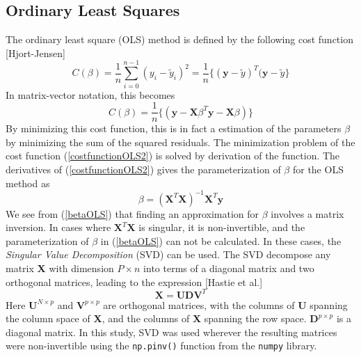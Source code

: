 \documentclass{article}
\begin{document}
\subsection{Ordinary Least Squares}\label{OLSsection}
The ordinary least square (OLS) method is defined by the following cost function [Hjort-Jensen]
\begin{equation}\label{costfunctionOLS}
C(\beta) = \frac{1}{n} \sum_{i=0}^{n-1} (y_{i} - \tilde{y}_{i})^{2} = \frac{1}{n} \{ (\textbf{y} - \tilde{y})^{T} (\textbf{y} - \tilde{y} \}
\end{equation}
In matrix-vector notation, this becomes
\begin{equation}\label{costfunctionOLS2}
C(\beta)= \dfrac{1}{n} \{( \textbf{y}-\textbf{X}\beta^{T}\textbf{y}-\textbf{X}\beta)\}
\end{equation}
By minimizing this cost function, this is in fact a estimation of the parameters $\beta$ by minimizing the sum of the squared residuals. The minimization problem of the cost function (\ref{costfunctionOLS2}) is solved by derivation of the function. The derivatives of (\ref{costfunctionOLS2}) gives the parameterization of $\beta$ for the OLS method as
\begin{equation}\label{betaOLS}
\beta = (\textbf{X}^{T}\textbf{X})^{-1}\textbf{X}^{T}\textbf{y}
\end{equation}
We see from (\ref{betaOLS}) that finding an approximation for $\beta$ involves a matrix inversion. In cases where $\textbf{X}^{T}\textbf{X}$ is singular, it is non-invertible, and the parameterization of $\beta$ in (\ref{betaOLS}) can not be calculated. In these cases, the \textit{Singular Value Decomposition} (SVD) can be used. The SVD decompose any matrix \textbf{X} with dimension $P \times n$ into terms of a diagonal matrix and two orthogonal matrices, leading to the expression [Hastie et al.]
\begin{equation}
\textbf{X} = \textbf{U} \textbf{D} \textbf{V}^{T}
\end{equation}
Here $\textbf{U}^{N \times p}$ and $\textbf{V}^{p \times p}$ are orthogonal matrices, with the columns of \textbf{U} spanning the column space of \textbf{X}, and the columns of \textbf{X} spanning the row space. $\textbf{D}^{p \times p}$ is a diagonal matrix. In this study, SVD was used wherever the resulting matrices were non-invertible using the \verb+np.pinv()+ function from the \verb+numpy+ library.
\end{document}
